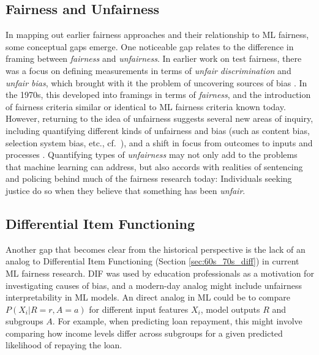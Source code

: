 \documentclass[sigconf,letterpaper,9pt]{acmart}
\newcommand\bnote[1]{{\color{red}{#1 -B}}}
\newcommand\mnote[1]{{\color{blue}{#1 -M}}}
\begin{document}
\subsection{Fairness and Unfairness} 
In mapping out earlier fairness approaches and their relationship to ML fairness, some conceptual gaps emerge.  One noticeable gap relates to the difference in framing between {\em fairness} and {\em unfairness}.  In earlier work on test fairness, there was a focus on defining measurements in terms of {\em unfair discrimination} and {\em unfair bias}, which brought with it the problem of uncovering sources of bias \cite{cleary1968investigation}.  In the 1970s, this developed into framings in terms of {\em fairness}, and the introduction of fairness criteria similar or identical to ML fairness criteria known today. However, returning to the idea of unfairness suggests several new areas of inquiry, including quantifying different kinds of unfairness and bias (such as content bias, selection system bias, etc., cf.~\cite{jencks1998racial}), and a shift in focus from outcomes to inputs and processes \cite{cojuharenco2013workplace}.  Quantifying types of {\em unfairness} may not only add to the problems that machine learning can address, but also accords with realities of sentencing and policing behind much of the fairness research today:  Individuals seeking justice do so when they believe that something has been {\em unfair}.  

\subsection{Differential Item Functioning} 

Another gap that becomes clear from the historical perspective is the lack of an analog to Differential Item Functioning (Section \ref{sec:60s_70s_diff}) in current ML fairness research. 
DIF was used by education professionals as a motivation for investigating causes of bias, and a modern-day analog might include unfairness interpretability in ML models.  An direct analog in ML could be to compare $P(X_i | R=r, A=a)$ for different
input features $X_i$, model outputs $R$ and subgroups $A$. For example, when predicting loan
repayment, this might involve comparing how income levels differ across subgroups 
for a given predicted likelihood of repaying the loan.
\end{document}
